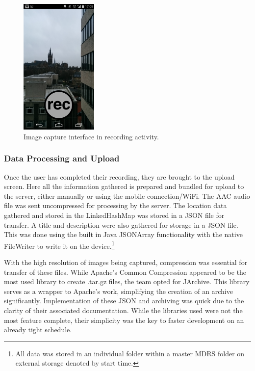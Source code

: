 \documentclass{l3proj}
\begin{document}
\begin{figure}[ht!]
\centering
\includegraphics[width=0.34\textwidth]{images/record-screen-final.png}
\caption{Image capture interface in recording activity.}
\end{figure}

\subsubsection {Data Processing and Upload}
Once the user has completed their recording, they are brought to the upload screen. Here all the information gathered is prepared and bundled for upload to the server, either manually or using the mobile connection/WiFi. The AAC audio file was sent uncompressed for processing by the server. The location data gathered and stored in the LinkedHashMap was stored in a JSON file for transfer. A title and description were also gathered for storage in a JSON file. This was done using the built in Java JSONArray functionality with the native FileWriter to write it on the device.\footnote{All data was stored in an individual folder within a master MDRS folder on external storage denoted by start time.}

With the high resolution of images being captured, compression was essential for transfer of these files. While Apache’s Common Compression appeared to be the most used library to create .tar.gz files, the team opted for JArchive. This library serves as a wrapper to Apache’s work, simplifying the creation of an archive significantly. Implementation of these JSON and archiving was quick due to the clarity of their associated documentation. While the libraries used were not the most feature complete, their simplicity was the key to faster development on an already tight schedule.
\end{document}
